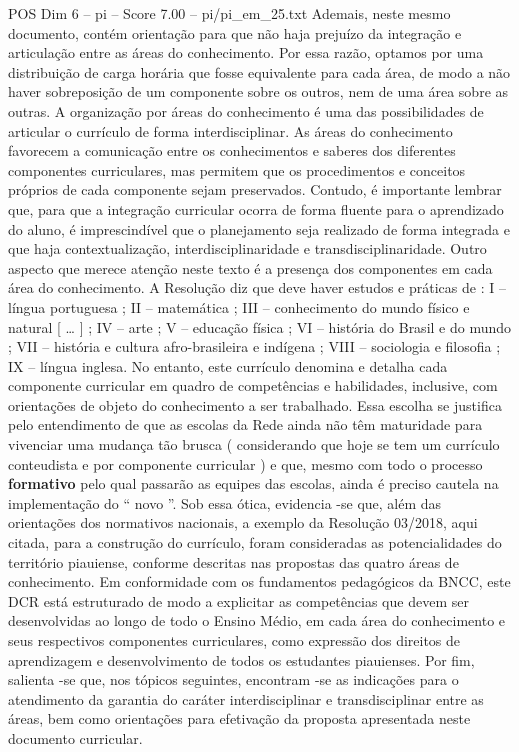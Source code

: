 \begin{textsample}{POS Dim 6 – pi – Score 7.00 – pi/pi\_em\_25.txt}
Ademais, neste mesmo documento, contém orientação para que não haja prejuízo da integração e articulação entre as áreas do conhecimento.
Por essa razão, optamos por uma distribuição de carga horária que fosse equivalente para cada área, de modo a não haver sobreposição de um componente sobre os outros, nem de uma área sobre as outras.
A organização por áreas do conhecimento é uma das possibilidades de articular o currículo de forma interdisciplinar.
As áreas do conhecimento favorecem a comunicação entre os conhecimentos e saberes dos diferentes componentes curriculares, mas permitem que os procedimentos e conceitos próprios de cada componente sejam preservados.
Contudo, é importante lembrar que, para que a integração curricular ocorra de forma fluente para o aprendizado do aluno, é imprescindível que o planejamento seja realizado de forma integrada e que haja contextualização, interdisciplinaridade e transdisciplinaridade.
Outro aspecto que merece atenção neste texto é a presença dos componentes em cada área do conhecimento.
A Resolução diz que deve haver estudos e práticas de : I – língua portuguesa ; II – matemática ; III – conhecimento do mundo físico e natural [ … ] ; IV – arte ; V – educação física ; VI – história do Brasil e do mundo ; VII – história e cultura afro-brasileira e indígena ; VIII – sociologia e filosofia ; IX – língua inglesa.
No entanto, este currículo denomina e detalha cada componente curricular em quadro de competências e habilidades, inclusive, com orientações de objeto do conhecimento a ser trabalhado.
Essa escolha se justifica pelo entendimento de que as escolas da Rede ainda não têm maturidade para vivenciar uma mudança tão brusca ( considerando que hoje se tem um currículo conteudista e por componente curricular ) e que, mesmo com todo o processo \textbf{formativo} pelo qual passarão as equipes das escolas, ainda é preciso cautela na implementação do “ novo ”.
Sob essa ótica, evidencia -se que, além das orientações dos normativos nacionais, a exemplo da Resolução 03/2018, aqui citada, para a construção do currículo, foram consideradas as potencialidades do território piauiense, conforme descritas nas propostas das quatro áreas de conhecimento.
Em conformidade com os fundamentos pedagógicos da BNCC, este DCR está estruturado de modo a explicitar as competências que devem ser desenvolvidas ao longo de todo o Ensino Médio, em cada área do conhecimento e seus respectivos componentes curriculares, como expressão dos direitos de aprendizagem e desenvolvimento de todos os estudantes piauienses.
Por fim, salienta -se que, nos tópicos seguintes, encontram -se as indicações para o atendimento da garantia do caráter interdisciplinar e transdisciplinar entre as áreas, bem como orientações para efetivação da proposta apresentada neste documento curricular.

\end{textsample}
